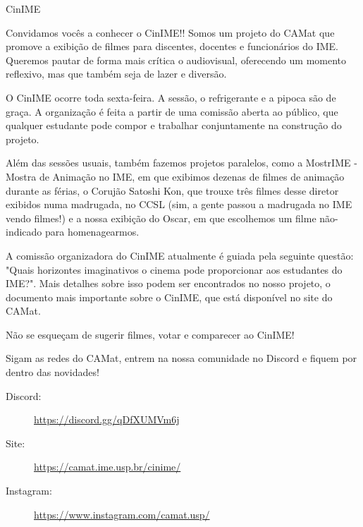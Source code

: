 \begin{subsecao}{CinIME}


Convidamos vocês a conhecer o CinIME!! Somos um projeto do CAMat que promove a
exibição de filmes para discentes, docentes e funcionários do IME. Queremos pautar
de forma mais crítica o audiovisual, oferecendo um momento reflexivo, mas que 
também seja de lazer e diversão.

O CinIME ocorre toda sexta-feira. A sessão, o refrigerante e a pipoca são de graça. 
A organização é feita a partir de uma comissão aberta ao público, que
qualquer estudante pode compor e trabalhar conjuntamente na construção do projeto. 

Além das sessões usuais, também fazemos projetos paralelos, como a MostrIME - Mostra de
Animação no IME, em que exibimos dezenas de filmes de animação durante as férias, o Corujão
Satoshi Kon, que trouxe três filmes desse diretor exibidos numa madrugada, no CCSL (sim, a gente
passou a madrugada no IME vendo filmes!) e a nossa exibição do Oscar, em que escolhemos um filme
não-indicado para homenagearmos. 

A comissão organizadora do CinIME atualmente é guiada pela seguinte questão: "Quais 
horizontes imaginativos o cinema pode proporcionar aos estudantes do IME?". Mais detalhes
sobre isso podem ser encontrados no nosso projeto, o documento mais importante sobre o 
CinIME, que está disponível no site do CAMat.

Não se esqueçam de sugerir filmes, votar e comparecer ao CinIME!

Sigam as redes do CAMat, entrem na nossa comunidade no Discord e fiquem por dentro das novidades!

\begin{description}
  \item[Discord:] \url{https://discord.gg/qDfXUMVm6j}
  \item[Site:] \url{https://camat.ime.usp.br/cinime/}
  \item[Instagram:] \url{https://www.instagram.com/camat.usp/}
\end{description}

\end{subsecao}
